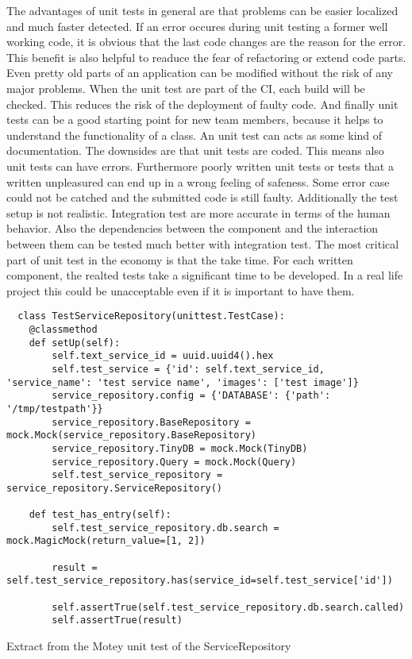 The advantages of unit tests in general are that problems can be easier localized and much faster detected.
If an error occures during unit testing a former well working code, it is obvious that the last code changes are the reason for the error.
This benefit is also helpful to readuce the fear of refactoring or extend code parts.
Even pretty old parts of an application can be modified without the risk of any major problems.
When the unit test are part of the \ac{CI}, each build will be checked.
This reduces the risk of the deployment of faulty code.
And finally unit tests can be a good starting point for new team members, because it helps to understand the functionality of a class.
An unit test can acts as some kind of documentation.
The downsides are that unit tests are coded.
This means also unit tests can have errors.
Furthermore poorly written unit tests or tests that a written unpleasured can end up in a wrong feeling of safeness.
Some error case could not be catched and the submitted code is still faulty.
Additionally the test setup is not realistic.
Integration test are more accurate in terms of the human behavior.
Also the dependencies between the component and the interaction between them can be tested much better with integration test.
The most critical part of unit test in the economy is that the take time.
For each written component, the realted tests take a significant time to be developed.
In a real life project this could be unacceptable even if it is important to have them.\newline

\begin{listing}[H]
  \begin{verbatim}
  class TestServiceRepository(unittest.TestCase):
    @classmethod
    def setUp(self):
        self.text_service_id = uuid.uuid4().hex
        self.test_service = {'id': self.text_service_id, 'service_name': 'test service name', 'images': ['test image']}
        service_repository.config = {'DATABASE': {'path': '/tmp/testpath'}}
        service_repository.BaseRepository = mock.Mock(service_repository.BaseRepository)
        service_repository.TinyDB = mock.Mock(TinyDB)
        service_repository.Query = mock.Mock(Query)
        self.test_service_repository = service_repository.ServiceRepository()

    def test_has_entry(self):
        self.test_service_repository.db.search = mock.MagicMock(return_value=[1, 2])

        result = self.test_service_repository.has(service_id=self.test_service['id'])

        self.assertTrue(self.test_service_repository.db.search.called)
        self.assertTrue(result)
  \end{verbatim}
  \caption{Extract from the Motey unit test of the ServiceRepository}
  \label{code:sample_unit_test}
\end{listing}

